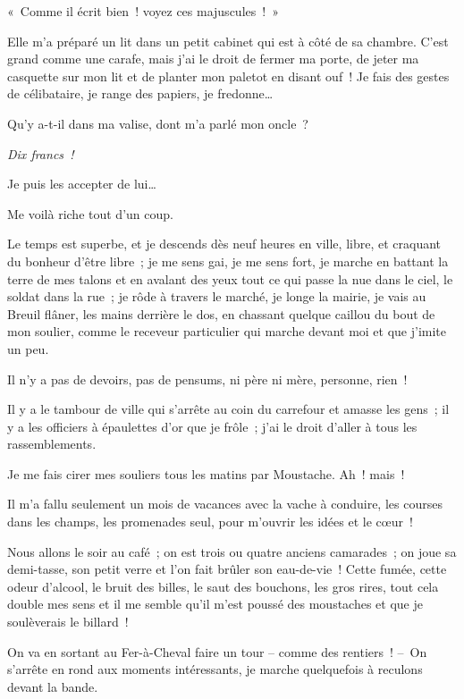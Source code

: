 \documentclass[french,twoside]{book} %
\begin{document}
« Comme il écrit bien ! voyez ces majuscules ! »\par
Elle m’a préparé un lit dans un petit cabinet qui est à côté de sa chambre. C’est grand comme une carafe, mais j’ai le droit de fermer ma porte, de jeter ma casquette sur mon lit et de planter mon paletot en disant ouf ! Je fais des gestes de célibataire, je range des papiers, je fredonne…\par
\bigbreak
\noindent Qu’y a-t-il dans ma valise, dont m’a parlé mon oncle ?\par
{\itshape Dix francs !}\par
Je puis les accepter de lui…\par
Me voilà riche tout d’un coup.\par
\bigbreak
\noindent Le temps est superbe, et je descends dès neuf heures en ville, libre, et craquant du bonheur d’être libre ; je me sens gai, je me sens fort, je marche en battant la terre de mes talons et en avalant des yeux tout ce qui passe la nue dans le ciel, le soldat dans la rue ; je rôde à travers le marché, je longe la mairie, je vais au Breuil flâner, les mains derrière le dos, en chassant quelque caillou du bout de mon soulier, comme le receveur particulier qui marche devant moi et que j’imite un peu.\par
Il n’y a pas de devoirs, pas de pensums, ni père ni mère, personne, rien !\par
Il y a le tambour de ville qui s’arrête au coin du carrefour et amasse les gens ; il y a les officiers à épaulettes d’or que je frôle ; j’ai le droit d’aller à tous les rassemblements.\par
Je me fais cirer mes souliers tous les matins par Moustache. Ah ! mais !\par
Il m’a fallu seulement un mois de vacances avec la vache à conduire, les courses dans les champs, les promenades seul, pour m’ouvrir les idées et le cœur !\par
\bigbreak
\noindent Nous allons le soir au café ; on est trois ou quatre anciens camarades ; on joue sa demi-tasse, son petit verre et l’on fait brûler son eau-de-vie ! Cette fumée, cette odeur d’alcool, le bruit des billes, le saut des bouchons, les gros rires, tout cela double mes sens et il me semble qu’il m’est poussé des moustaches et que je soulèverais le billard !\par
On va en sortant au Fer-à-Cheval faire un tour – comme des rentiers ! – On s’arrête en rond aux moments intéressants, je marche quelquefois à reculons devant la bande.\par
\end{document}
